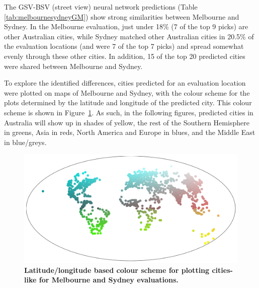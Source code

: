 \documentclass[Crown,sageh,times]{sagej}
\begin{document}
The GSV-BSV (street view) neural network predictions (Table \ref{tab:melbournesydneyGM}) show strong similarities between Melbourne and Sydney. In the Melbourne evaluation, just under 18\% (7 of the top 9 picks) are other Australian cities, while Sydney matched other Australian cities in 20.5\% of the evaluation locations (and were 7 of the top 7 picks) and spread somewhat evenly through these other cities. In addition, 15 of the top 20 predicted cities were shared between Melbourne and Sydney.



To explore the identified differences, cities predicted for an evaluation location were plotted on maps of Melbourne and Sydney, with the colour scheme for the plots determined by the latitude and longitude of the predicted city. This colour scheme is shown in Figure~\ref{fig:colorscheme}.  As such, in the following figures, predicted cities in Australia will show up in shades of yellow, the rest of the Southern Hemisphere in greens, Asia in reds, North America and Europe in blues, and the Middle East in blue/greys.



\begin{figure}[!htbp]
\centering    
\includegraphics[scale=0.25]{Images/PlosOne/Fig5.png} 
\caption{\bf Latitude/longitude based colour scheme for plotting cities-like for Melbourne and Sydney evaluations.}    
 \label{fig:colorscheme}  
\end{figure} 
\end{document}
